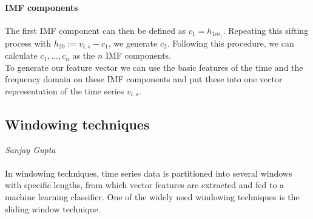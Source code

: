 \paragraph{IMF components}
The first IMF component can then be defined as $c_1 = h_{1m_1}$.
Repeating this sifting process with $h_{20} := v_{i,s} - c_1$, we generate $c_2$.
Following this procedure, we can calculate $c_1, \dots , c_n$ as the $n$ IMF components.\\
To generate our feature vector we can use the basic features of the time and the frequency domain on these IMF components and put these into one vector representation of the time series $v_{i,s}$.

\subsection{Windowing techniques}
\vspace*{-15mm}
\hfill{\normalsize\emph{Sanjay Gupta}}\label{sec:feature-extraction:approaches:windowing}
\\\\
In windowing techniques, time series data is partitioned into several windows with specific lengths, from which vector features are 
extracted and fed to a machine learning classifier. One of the widely used windowing techniques is the sliding window technique.

